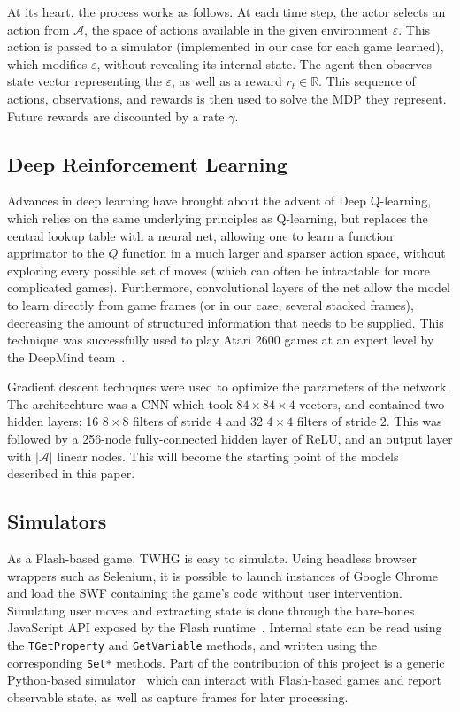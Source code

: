 \documentclass[12pt]{article}
\begin{document}
At its heart, the process works as follows. At each time step, the actor selects an action from $\mathcal{A}$, the space of actions available in the given environment $\varepsilon$. This action is passed to a simulator (implemented in our case for each game learned), which modifies $\varepsilon$, without revealing its internal state. The agent then observes state vector representing the $\varepsilon$, as well as a reward $r_t \in \mathbb{R}$. This sequence of actions, observations, and rewards is then used to solve the MDP they represent. Future rewards are discounted by a rate $\gamma$.

\subsection{Deep Reinforcement Learning}

Advances in deep learning have brought about the advent of Deep Q-learning, which relies on the same underlying principles as Q-learning, but replaces the central lookup table with a neural net, allowing one to learn a function apprimator to the $Q$ function in a much larger and sparser action space, without exploring every possible set of moves (which can often be intractable for more complicated games). Furthermore, convolutional layers of the net allow the model to learn directly from game frames (or in our case, several stacked frames), decreasing the amount of structured information that needs to be supplied. This technique was successfully used to play Atari 2600 games at an expert level by the DeepMind team~\cite{deepmind}.

Gradient descent technques were used to optimize the parameters of the network. The architechture was a CNN which took $84 \times 84 \times 4$ vectors, and contained two hidden layers: 16 $8 \times 8$ filters of stride $4$ and 32 $4 \times 4$ filters of stride $2$. This was followed by a 256-node fully-connected hidden layer of ReLU, and an output layer with $|\mathcal{A}|$ linear nodes. This will become the starting point of the models described in this paper.

\subsection{Simulators}

As a Flash-based game, TWHG is easy to simulate. Using headless browser wrappers such as Selenium, it is possible to launch instances of Google Chrome and load the SWF containing the game's code without user intervention. Simulating user moves and extracting state is done through the bare-bones JavaScript API exposed by the Flash runtime~\cite{flashjs}. Internal state can be read using the \texttt{TGetProperty} and \texttt{GetVariable} methods, and written using the corresponding \texttt{Set*} methods. Part of the contribution of this project is a generic Python-based simulator~\cite{simulator} which can interact with Flash-based games and report observable state, as well as capture frames for later processing.
\end{document}
